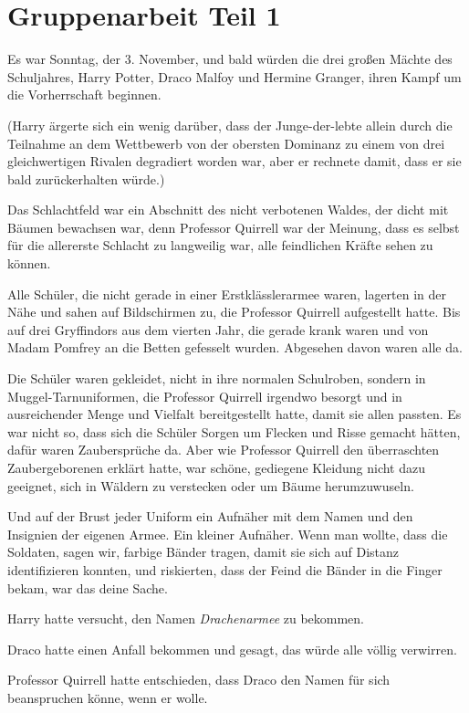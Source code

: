 \chapter{Gruppenarbeit Teil 1}

Es war Sonntag, der 3. November, und bald würden die drei großen Mächte des
Schuljahres, Harry Potter, Draco Malfoy und Hermine Granger, ihren Kampf um die
Vorherrschaft beginnen.

(Harry ärgerte sich ein wenig darüber, dass der Junge-der-lebte allein durch die
Teilnahme an dem Wettbewerb von der obersten Dominanz zu einem von drei
gleichwertigen Rivalen degradiert worden war, aber er rechnete damit, dass er
sie bald zurückerhalten würde.)

Das Schlachtfeld war ein Abschnitt des nicht verbotenen Waldes, der dicht mit
Bäumen bewachsen war, denn Professor Quirrell war der Meinung, dass es selbst
für die allererste Schlacht zu langweilig war, alle feindlichen Kräfte sehen zu
können.

Alle Schüler, die nicht gerade in einer Erstklässlerarmee waren, lagerten in der
Nähe und sahen auf Bildschirmen zu, die Professor Quirrell aufgestellt hatte.
Bis auf drei Gryffindors aus dem vierten Jahr, die gerade krank waren und von
Madam Pomfrey an die Betten gefesselt wurden. Abgesehen davon waren alle da.

Die Schüler waren gekleidet, nicht in ihre normalen Schulroben, sondern in
Muggel-Tarnuniformen, die Professor Quirrell irgendwo besorgt und in
ausreichender Menge und Vielfalt bereitgestellt hatte, damit sie allen passten.
Es war nicht so, dass sich die Schüler Sorgen um Flecken und Risse gemacht
hätten, dafür waren Zaubersprüche da. Aber wie Professor Quirrell den
überraschten Zaubergeborenen erklärt hatte, war schöne, gediegene Kleidung nicht
dazu geeignet, sich in Wäldern zu verstecken oder um Bäume herumzuwuseln.

Und auf der Brust jeder Uniform ein Aufnäher mit dem Namen und den Insignien der
eigenen Armee. Ein kleiner Aufnäher. Wenn man wollte, dass die Soldaten, sagen
wir, farbige Bänder tragen, damit sie sich auf Distanz identifizieren konnten,
und riskierten, dass der Feind die Bänder in die Finger bekam, war das deine
Sache.

Harry hatte versucht, den Namen \emph{Drachenarmee} zu bekommen.

Draco hatte einen Anfall bekommen und gesagt, das würde alle völlig verwirren.

Professor Quirrell hatte entschieden, dass Draco den Namen für sich beanspruchen
könne, wenn er wolle.

